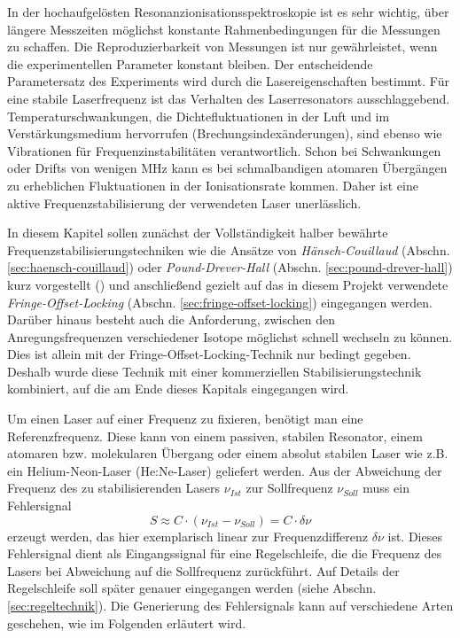 In der hochaufgelösten Resonanzionisationsspektroskopie ist es
sehr wichtig, über längere Messzeiten möglichst konstante Rahmenbedingungen für
die Messungen zu schaffen. Die Reproduzierbarkeit von Messungen ist nur
gewährleistet, wenn die experimentellen Parameter konstant bleiben. Der
entscheidende Parametersatz des Experiments wird durch die Lasereigenschaften
bestimmt. Für eine stabile Laserfrequenz ist das Verhalten des Laserresonators
ausschlaggebend. Temperaturschwankungen, die Dichtefluktuationen in der Luft und
im Verstärkungsmedium hervorrufen (Brechungsindexänderungen), sind ebenso wie
Vibrationen für Frequenzinstabilitäten verantwortlich. Schon bei Schwankungen
oder Drifts von wenigen MHz kann es bei schmalbandigen atomaren Übergängen zu
erheblichen Fluktuationen in der Ionisationsrate kommen. Daher ist eine aktive
Frequenzstabilisierung der verwendeten Laser unerlässlich.\par
In diesem Kapitel sollen zunächst der Vollständigkeit halber bewährte
Frequenzstabilisierungstechniken wie die Ansätze von \textit{Hänsch-Couillaud}
(Abschn. \ref{sec:haensch-couillaud}) oder \textit{Pound-Drever-Hall} (Abschn.
\ref{sec:pound-drever-hall}) kurz vorgestellt
(\cite{noertershaeuser:physik_des_lasers}) und anschließend gezielt auf das
in diesem Projekt verwendete \textit{Fringe-Offset-Locking} (Abschn.
\ref{sec:fringe-offset-locking}) eingegangen werden. Darüber hinaus
besteht auch die Anforderung, zwischen den Anregungsfrequenzen verschiedener
Isotope möglichst schnell wechseln zu können. Dies ist allein mit der
Fringe-Offset-Locking-Technik nur bedingt gegeben. Deshalb wurde diese Technik
mit einer kommerziellen Stabilisierungstechnik kombiniert, auf die am Ende
dieses Kapitals eingegangen wird.\par
Um einen Laser auf einer Frequenz zu fixieren, benötigt
man eine Referenzfrequenz. Diese kann von einem passiven, stabilen Resonator,
einem atomaren bzw. molekularen Übergang oder einem absolut stabilen Laser wie z.B.
ein Helium-Neon-Laser (He:Ne-Laser) geliefert werden.
Aus der Abweichung der Frequenz des zu stabilisierenden Lasers $\nu_{Ist}$ zur
Sollfrequenz $\nu_{Soll}$ muss ein Fehlersignal
\begin{equation}\label{eq:servoschleife_fehlersignal}
	S\approx C\cdot(\nu_{Ist}-\nu_{Soll})=C\cdot\delta\nu
\end{equation}
erzeugt werden, das hier exemplarisch linear zur Frequenzdifferenz $\delta\nu$
ist. Dieses Fehlersignal dient als Eingangssignal für eine Regelschleife, die
die Frequenz des Lasers bei Abweichung auf die Sollfrequenz zurückführt. Auf
Details der Regelschleife soll später genauer eingegangen werden (siehe
Abschn. \ref{sec:regeltechnik}). Die Generierung des Fehlersignals kann auf
verschiedene Arten geschehen, wie im Folgenden erläutert wird.

